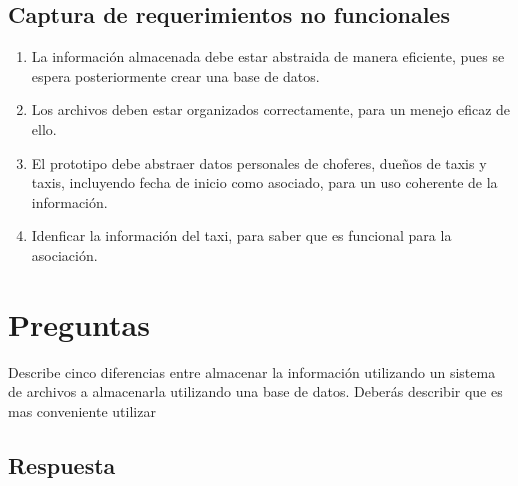 \documentclass[
	10pt, %
	spanish %
]{fphw}
\begin{document}
\subsection*{Captura de requerimientos no funcionales}
\begin{enumerate}
	\item La información almacenada debe estar abstraida de manera eficiente, pues se espera posteriormente crear una base de 
	datos.
	\item Los archivos deben estar organizados correctamente, para un menejo eficaz de ello. 
	\item El prototipo debe abstraer datos personales de choferes, dueños de taxis y taxis, incluyendo fecha de inicio como 		asociado, para un uso coherente de la información.
	\item Idenficar la información del taxi, para saber que es funcional para la asociación.	
\end{enumerate}

\section*{Preguntas}

\begin{problem}
Describe cinco diferencias entre almacenar la información utilizando un sistema de archivos a almacenarla utilizando una base
de datos. Deberás describir que es mas conveniente utilizar
\end{problem}

\subsection*{Respuesta}
\end{document}
